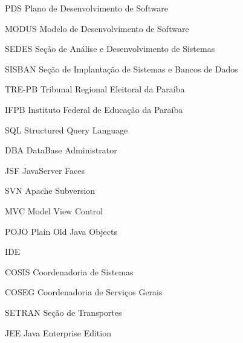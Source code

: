 
\begin{siglas}
    \item[PDS] Plano de Desenvolvimento de Software
    \item[MODUS] Modelo de Desenvolvimento de Software
    \item[SEDES] Seção de Análise e Desenvolvimento de Sistemas
    \item[SISBAN]Seção de Implantação de Sistemas e Bancos de Dados
    \item[TRE-PB] Tribunal Regional Eleitoral da Paraíba
    \item[IFPB] Instituto Federal de Educação da Paraíba
    \item[SQL] Structured Query Language
    \item[DBA] DataBase Administrator
    \item[JSF] JavaServer Faces
    \item[SVN] Apache Subversion
    \item[MVC] Model View Control
    \item[POJO] Plain Old Java Objects
    \item[IDE] 
    \item[COSIS] Coordenadoria de Sistemas
    \item[COSEG] Coordenadoria de Serviços Gerais
    \item[SETRAN] Seção de Transportes
    \item[JEE] Java Enterprise Edition  
\end{siglas}

